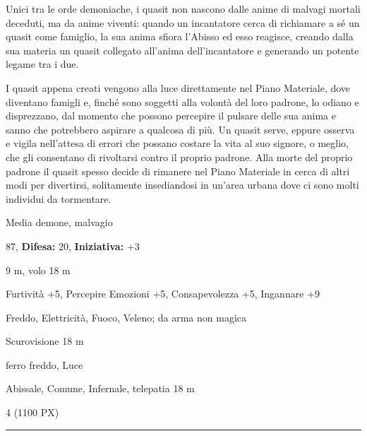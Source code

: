 \begin{multicols}{2}
{Unici tra le orde demoniache, i quasit non nascono dalle anime di malvagi mortali deceduti, ma da anime viventi: quando un incantatore cerca di richiamare a sé un quasit come famiglio, la sua anima sfiora l'Abisso ed esso reagisce, creando dalla sua materia un quasit collegato all'anima dell'incantatore e generando un potente legame tra i due.

I quasit appena creati vengono alla luce direttamente nel Piano Materiale, dove diventano famigli e, finché sono soggetti alla volontà del loro padrone, lo odiano e disprezzano, dal momento che possono percepire il pulsare delle sua anima e sanno che potrebbero aspirare a qualcosa di più. Un quasit serve, eppure osserva e vigila nell'attesa di errori che possano costare la vita al suo signore, o meglio, che gli consentano di rivoltarsi contro il proprio padrone. Alla morte del proprio padrone il quasit spesso decide di rimanere nel Piano Materiale in cerca di altri modi per divertirsi, solitamente insediandosi in un'area urbana dove ci sono molti individui da tormentare.

\noindent
\begin{description}[noitemsep, topsep=0pt, parsep=0pt, partopsep=0pt, leftmargin=0cm, labelwidth=2.2cm]
	\item[\textbf{Taglia/Tipo:}] Media demone, malvagio
	\item[\textbf{Caratt.:}] 
	\item[\textbf{Punti Ferita:}] 87,  \textbf{Difesa:} 20,  \textbf{Iniziativa:} +3
	\item[\textbf{Movimento:}] 9 m, volo 18 m
	\item[\textbf{Tiri Salvez.:}] 
	\item[\textbf{Comp.:}] Furtività +5, Percepire Emozioni +5, Consapevolezza +5, Ingannare +9
	\item[\textbf{Res. Danni:}] Freddo, Elettricità, Fuoco, Veleno; da arma non magica
	\item[\textbf{Sensi:}] Scurovisione 18 m
	\item[\textbf{Vulnerabilità:}] ferro freddo, Luce
	\item[\textbf{Linguaggi:}] Abissale, Comune, Infernale, telepatia 18 m
	\item[\textbf{Sfida:}] 4 (1100 PX)
\end{description}

\noindent\rule{\linewidth}{2pt}

}
\end{multicols}
